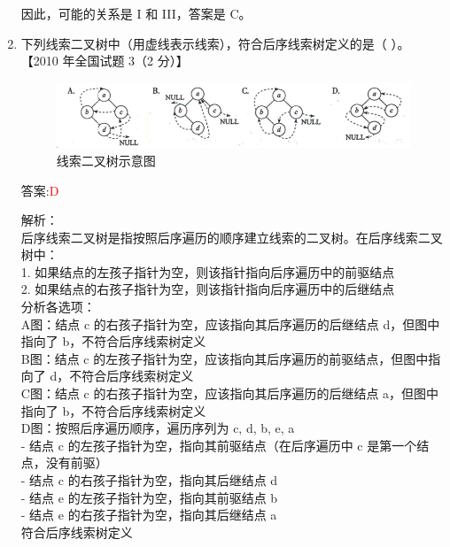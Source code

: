 \documentclass[lang=cn,newtx,10pt,scheme=chinese]{../../../elegantbook}
\begin{document}
\begin{enumerate}
        因此，可能的关系是 I 和 III，答案是 C。\\
    
        \item 下列线索二叉树中（用虚线表示线索），符合后序线索树定义的是（ ）。  
        【2010 年全国试题 3（2 分）】  
    
        \begin{figure}[h!]
                \centering
                \includegraphics[width=1\textwidth]{../../figure/exercisePicPDF/chapter6/6-12.pdf}
                \caption{线索二叉树示意图}
        \end{figure}
    
        答案:\textcolor{red}{D}
        
        解析：\\
        后序线索二叉树是指按照后序遍历的顺序建立线索的二叉树。在后序线索二叉树中：\\
        1. 如果结点的左孩子指针为空，则该指针指向后序遍历中的前驱结点\\
        2. 如果结点的右孩子指针为空，则该指针指向后序遍历中的后继结点\\
        
        分析各选项：\\
        A图：结点 c 的右孩子指针为空，应该指向其后序遍历的后继结点 d，但图中指向了 b，不符合后序线索树定义\\
        
        B图：结点 c 的左孩子指针为空，应该指向其后序遍历的前驱结点，但图中指向了 d，不符合后序线索树定义\\
        
        C图：结点 c 的右孩子指针为空，应该指向其后序遍历的后继结点 a，但图中指向了 b，不符合后序线索树定义\\
        
        D图：按照后序遍历顺序，遍历序列为 c, d, b, e, a\\
        - 结点 c 的左孩子指针为空，指向其前驱结点（在后序遍历中 c 是第一个结点，没有前驱）\\
        - 结点 c 的右孩子指针为空，指向其后继结点 d\\
        - 结点 e 的左孩子指针为空，指向其前驱结点 b\\
        - 结点 e 的右孩子指针为空，指向其后继结点 a\\
        符合后序线索树定义\\
        

\end{enumerate}
\end{document}
